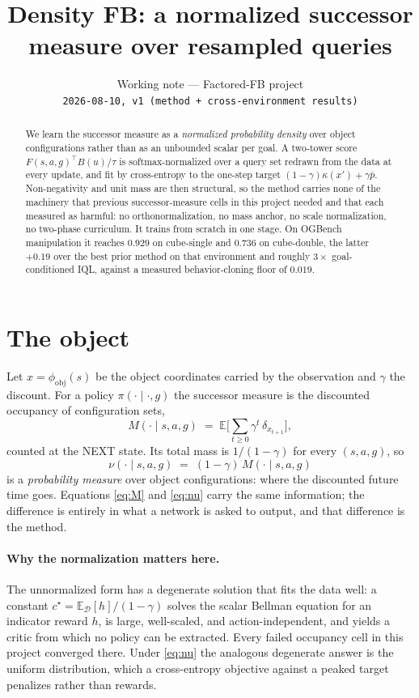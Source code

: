 \documentclass{article}
\title{Density FB: a normalized successor measure over resampled queries}
\author{Working note --- Factored-FB project\\
\texttt{2026-08-10, v1 (method + cross-environment results)}}
\providecommand{\E}{\mathbb{E}}
\newcommand{\dnu}{\nu}
\begin{document}
\maketitle

\begin{abstract}
We learn the successor measure as a \emph{normalized probability density} over object
configurations rather than as an unbounded scalar per goal. A two-tower score
$F(s,a,g)^\top B(u)/\tau$ is softmax-normalized over a query set redrawn from the data at
every update, and fit by cross-entropy to the one-step target
$(1-\gamma)\kappa(x') + \gamma\bar p$. Non-negativity and unit mass are then structural,
so the method carries none of the machinery that previous successor-measure cells in this
project needed and that each measured as harmful: no orthonormalization, no mass anchor,
no scale normalization, no two-phase curriculum. It trains from scratch in one stage.
On OGBench manipulation it reaches $0.929$ on cube-single and $0.736$ on cube-double,
the latter $+0.19$ over the best prior method on that environment and roughly
$3\times$ goal-conditioned IQL, against a measured behavior-cloning floor of $0.019$.
\end{abstract}

\section{The object}

Let $x=\phi_{\mathrm{obj}}(s)$ be the object coordinates carried by the observation and
$\gamma$ the discount. For a policy $\pi(\cdot\mid\cdot,g)$ the successor measure is the
discounted occupancy of configuration sets,
\begin{equation}
M(\cdot\mid s,a,g) \;=\; \E\Big[\textstyle\sum_{t\ge0}\gamma^{t}\,\delta_{x_{t+1}}\Big],
\label{eq:M}
\end{equation}
counted at the NEXT state. Its total mass is $1/(1-\gamma)$ for every $(s,a,g)$, so
\begin{equation}
\dnu(\cdot\mid s,a,g) \;=\; (1-\gamma)\,M(\cdot\mid s,a,g)
\label{eq:nu}
\end{equation}
is a \emph{probability measure} over object configurations: where the discounted future
time goes. Equations \eqref{eq:M} and \eqref{eq:nu} carry the same information; the
difference is entirely in what a network is asked to output, and that difference is the
method.

\paragraph{Why the normalization matters here.} The unnormalized form has a degenerate
solution that fits the data well: a constant $c^\star=\E_\mathcal{D}[h]/(1-\gamma)$ solves
the scalar Bellman equation for an indicator reward $h$, is large, well-scaled, and
action-independent, and yields a critic from which no policy can be extracted. Every
failed occupancy cell in this project converged there. Under \eqref{eq:nu} the analogous
degenerate answer is the uniform distribution, which a cross-entropy objective against a
peaked target penalizes rather than rewards.
\end{document}
